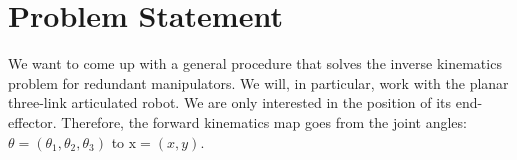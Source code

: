 \section{Problem Statement}
%
%
We want to come up with a general procedure that solves the inverse kinematics
problem for redundant manipulators. We will, in particular, work with the planar
three-link articulated robot. We are only interested in the position of its
end-effector. Therefore, the forward kinematics map goes from the joint angles:
$\theta = (\theta_1, \theta_2, \theta_3)$ to $\mathrm{x} = (x,y)$. 
